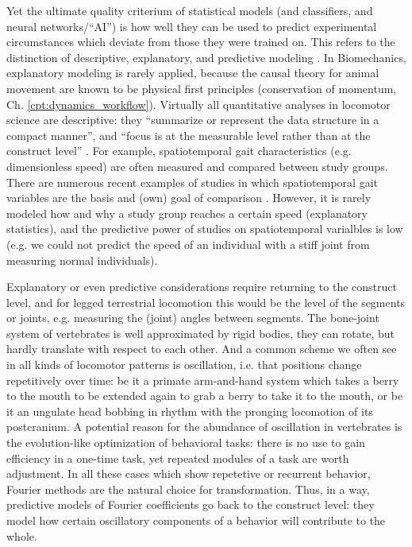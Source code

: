 Yet the ultimate quality criterium of statistical models (and classifiers, and neural networks/``AI'') is how well they can be used to predict experimental circumstances which deviate from those they were trained on.
This refers to the distinction of descriptive, explanatory, and predictive modeling \citep{Shmueli2010,Shmueli2011}.
In Biomechanics, explanatory modeling is rarely applied, because the causal theory for animal movement are known to be physical first principles (conservation of momentum, Ch. \ref{cpt:dynamics_workflow}).
Virtually all quantitative analyses in locomotor science are descriptive: they ``summarize or represent the data structure in a compact manner'', and ``focus is at the measurable level rather than at the construct level'' \citep{Shmueli2010}.
For example, spatiotemporal gait characteristics (e.g. dimensionless speed) are often measured and compared between study groups.
There are numerous recent examples of studies in which spatiotemporal gait variables are the basis and (own) goal of comparison  \citep[e.g.][]{Cheu2022,Ekhator2023,Plocek2023,Young2023,Jones2023,Druelle2021,McHenry2023}.
However, it is rarely modeled how and why a study group reaches a certain speed (explanatory statistics), and the predictive power of studies on spatiotemporal varialbles is low (e.g. we could not predict the speed of an individual with a stiff joint from measuring normal individuals).

Explanatory or even predictive considerations require returning to the construct level, and for legged terrestrial locomotion this would be the level of the segments or joints, e.g. measuring the (joint) angles between segments.
The bone-joint system of vertebrates is well approximated by rigid bodies, they can rotate, but hardly translate with respect to each other.
And a common scheme we often see in all kinds of locomotor patterns is oscillation, i.e. that positions change repetitively over time: be it a primate arm-and-hand system which takes a berry to the mouth to be extended again to grab a berry to take it to the mouth, or be it an ungulate head bobbing in rhythm with the pronging locomotion of its postcranium.
A potential reason for the abundance of oscillation in vertebrates is the evolution-like optimization of behavioral tasks: there is no use to gain efficiency in a one-time task, yet repeated modules of a task are worth adjustment.
In all these cases which show repetetive or recurrent behavior, Fourier methods are the natural choice for transformation.
Thus, in a way, predictive models of Fourier coefficients go back to the construct level: they model how certain oscillatory components of a behavior will contribute to the whole.


